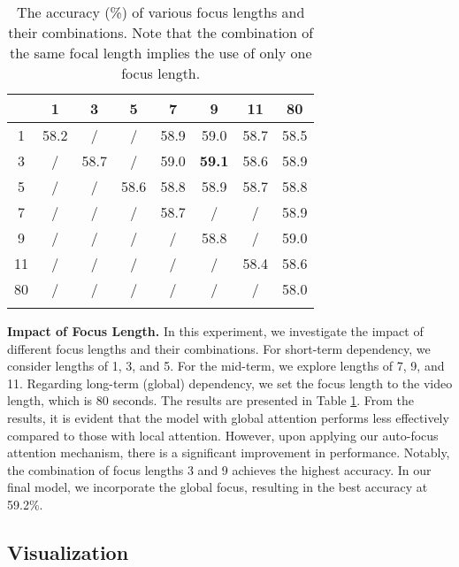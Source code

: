 {\begin{table}[t]
\caption{The accuracy (\%) of various focus lengths and their combinations. Note that the combination of the same focal length implies the use of only one focus length.} 
\label{fs}

\begin{tabular}{c|ccc|ccc|c}
\toprule
   & 1 & 3 & 5 & 7 & 9 & 11 & 80   \\ \midrule
1  & \cellcolor[HTML]{C0C0C0}58.2& / & / & 58.9& 59.0& 58.7& 58.5\\
3  & / & \cellcolor[HTML]{C0C0C0}58.7& / & 59.0& \textbf{59.1}& 58.6& 58.9\\
5  & / & / & \cellcolor[HTML]{C0C0C0}58.6& 58.8& 58.9& 58.7& 58.8\\ \midrule
7  & / & / & / & \cellcolor[HTML]{C0C0C0}58.7& / & /  & 58.9\\
9  & / & / & / & / & \cellcolor[HTML]{C0C0C0}58.8& /  & 59.0\\
11 & / & / & / & / & / & \cellcolor[HTML]{C0C0C0}58.4& 58.6\\ \midrule
80 & / & / & / & / & / & /  & \cellcolor[HTML]{C0C0C0}58.0 \\ \botrule
\end{tabular}
\end{table}

\noindent\textbf{Impact of Focus Length.} In this experiment, we investigate the impact of different focus lengths and their combinations. For short-term dependency, we consider lengths of 1, 3, and 5. For the mid-term, we explore lengths of 7, 9, and 11. Regarding long-term (global) dependency, we set the focus length to the video length, which is 80 seconds. The results are presented in Table \ref{fs}.
From the results, it is evident that the model with global attention performs less effectively compared to those with local attention. However, upon applying our auto-focus attention mechanism, there is a significant improvement in performance. Notably, the combination of focus lengths 3 and 9 achieves the highest accuracy. In our final model, we incorporate the global focus, resulting in the best accuracy at 59.2\%.



\subsection{Visualization}










}

